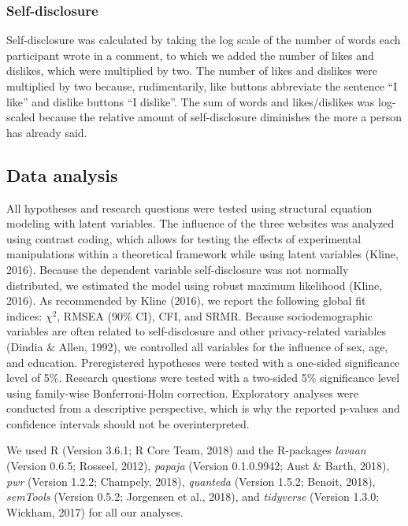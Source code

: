 \documentclass[
  english,
  man,floatsintext]{apa6}
\begin{document}
\hypertarget{self-disclosure}{%
\subsubsection{Self-disclosure}\label{self-disclosure}}

Self-disclosure was calculated by taking the log scale of the number of words each participant wrote in a comment, to which we added the number of likes and dislikes, which were multiplied by two.
The number of likes and dislikes were multiplied by two because, rudimentarily, like buttons abbreviate the sentence \enquote{I like} and dislike buttons \enquote{I dislike}.
The sum of words and likes/dislikes was log-scaled because the relative amount of self-disclosure diminishes the more a person has already said.

\hypertarget{data-analysis}{%
\subsection{Data analysis}\label{data-analysis}}

All hypotheses and research questions were tested using structural equation modeling with latent variables.
The influence of the three websites was analyzed using contrast coding, which allows for testing the effects of experimental manipulations within a theoretical framework while using latent variables (Kline, 2016).
Because the dependent variable self-disclosure was not normally distributed, we estimated the model using robust maximum likelihood (Kline, 2016).
As recommended by Kline (2016), we report the following global fit indices: \(\chi^2\), RMSEA (90\% CI), CFI, and SRMR.
Because sociodemographic variables are often related to self-disclosure and other privacy-related variables (Dindia \& Allen, 1992), we controlled all variables for the influence of sex, age, and education.
Preregistered hypotheses were tested with a one-sided significance level of 5\%.
Research questions were tested with a two-sided 5\% significance level using family-wise Bonferroni-Holm correction.
Exploratory analyses were conducted from a descriptive perspective, which is why the reported p-values and confidence intervals should not be overinterpreted.

We used R (Version 3.6.1; R Core Team, 2018) and the R-packages \emph{lavaan} (Version 0.6.5; Rosseel, 2012), \emph{papaja} (Version 0.1.0.9942; Aust \& Barth, 2018), \emph{pwr} (Version 1.2.2; Champely, 2018), \emph{quanteda} (Version 1.5.2; Benoit, 2018), \emph{semTools} (Version 0.5.2; Jorgensen et al., 2018), and \emph{tidyverse} (Version 1.3.0; Wickham, 2017) for all our analyses.
\end{document}
